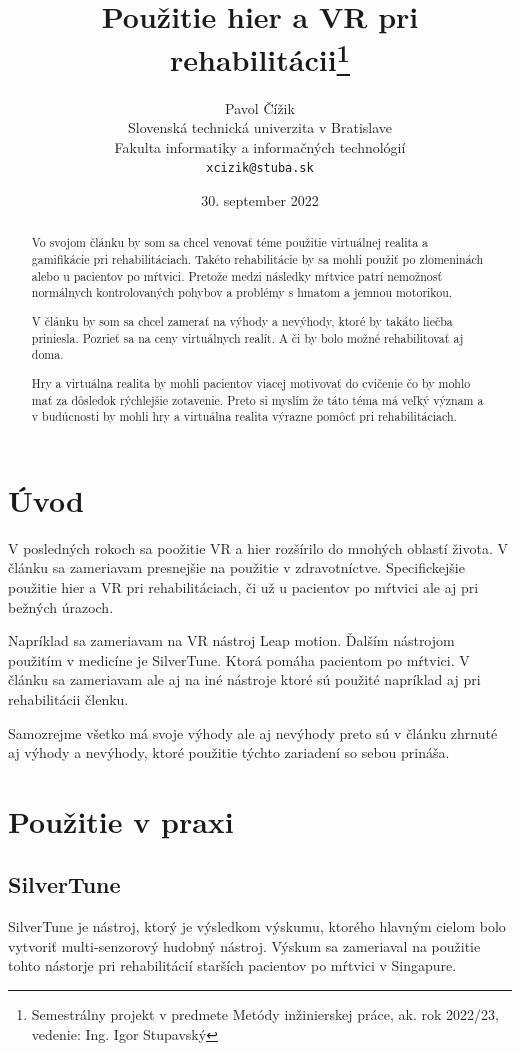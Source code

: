 \documentclass[10pt,twoside,slovak,a4paper]{article}
\title{Použitie hier a VR pri rehabilitácii\thanks{Semestrálny projekt v predmete Metódy inžinierskej práce, ak. rok 2022/23, vedenie: Ing. Igor Stupavský}} %
\author{Pavol Čížik\\[2pt]
	{\small Slovenská technická univerzita v Bratislave}\\
	{\small Fakulta informatiky a informačných technológií}\\
	{\small \texttt{xcizik@stuba.sk}}
	}
\date{\small 30. september 2022}
\begin{document}
\maketitle

\begin{abstract}
Vo svojom článku by som sa chcel venovať téme použitie virtuálnej realita a gamifikácie pri rehabilitáciach. Takéto rehabilitácie by sa mohli použiť po zlomeninách alebo u pacientov po mŕtvici. Pretože medzi následky mŕtvice patrí nemožnosť normálnych kontrolovaných pohybov a problémy s hmatom a jemnou motorikou. 

V článku by som sa chcel zamerať na výhody a nevýhody, ktoré by takáto liečba priniesla. Pozrieť sa na ceny virtuálnych realít. A či by bolo možné rehabilitovať aj doma. 

Hry a virtuálna realita by mohli pacientov viacej motivovať do cvičenie čo by mohlo mať za dôsledok rýchlejšie zotavenie. Preto si myslím že táto téma má veľký význam a v budúcnosti by mohli hry a virtuálna realita výrazne pomôcť pri rehabilitáciach.
\end{abstract}



\section{Úvod}

V posledných rokoch sa poožitie VR a hier rozšírilo do mnohých oblastí života. V článku sa zameriavam presnejšie na použitie v zdravotníctve. Specifickejšie použitie hier a VR pri rehabilitáciach, či už u pacientov po mŕtvici ale aj pri bežných úrazoch. 

Napríklad sa zameriavam na VR nástroj Leap motion. Ďalším nástrojom použitím v medicíne je  SilverTune. Ktorá pomáha pacientom po mŕtvici. V článku sa zameriavam ale aj na iné nástroje ktoré sú použité napríklad aj pri rehabilitácii členku. 

Samozrejme všetko má svoje výhody ale aj nevýhody preto sú v článku zhrnuté aj výhody a nevýhody, ktoré použitie týchto zariadení so sebou prináša.

\newpage

\section{Použitie v praxi}


\subsection{SilverTune}\cite{9483850}
SilverTune je nástroj, ktorý je výsledkom výskumu, ktorého hlavným cielom bolo vytvoriť multi-senzorový hudobný nástroj. Výskum sa zameriaval na použitie tohto nástorje pri rehabilitácií starších pacientov po mŕtvici v Singapure.
\newline
\end{document}
